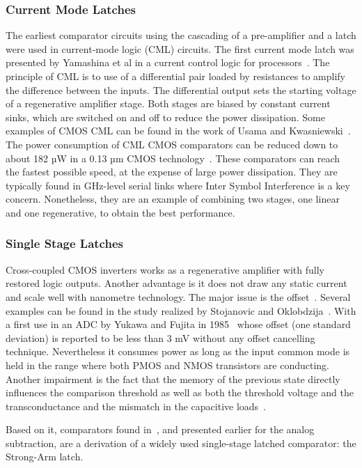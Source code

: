 \subsubsection{Current Mode Latches}
The earliest comparator circuits using the cascading of a pre-amplifier and a latch were used in current-mode logic (CML) circuits. The first current mode latch was presented by Yamashina et al in a current control logic for processors~\cite{Yamashina1994}. The principle of CML is to use of a differential pair loaded by resistances to amplify the difference between the inputs. The differential output sets the starting voltage of a regenerative amplifier stage. Both stages are biased by constant current sinks, which are switched on and off to reduce the power dissipation. Some examples of CMOS CML can be  found in the work of Usama and Kwasniewski~\cite{Usama2004}. The power consumption of CML CMOS comparators can be reduced down to about 182 µW in a 0.13 µm CMOS technology~\cite{Zhang2014cmp}. These comparators can reach the fastest possible speed, at the expense of large power dissipation. They are typically found in GHz-level serial links where Inter Symbol Interference is a key concern. Nonetheless, they are an example of combining two stages, one linear and one regenerative, to obtain the best performance.

\subsubsection{Single Stage Latches}
Cross-coupled CMOS inverters works as a regenerative amplifier with fully restored logic outputs. Another advantage is it does not draw any static current and scale well with nanometre technology. The major issue is the offset~\cite{Hajimiri1998}. Several examples can be found in the study realized by Stojanovic and Oklobdzija~\cite{Nikolic2000}. With a first use in an ADC by Yukawa and Fujita in 1985~\cite{Yukawa1985} whose offset (one standard deviation) is reported to be less than 3 mV without any offset cancelling technique. Nevertheless it consumes power as long as the input common mode is held in the range where both PMOS and NMOS transistors are conducting. Another impairment is the fact that the memory of the previous state directly influences the comparison threshold as well as both the threshold voltage and the transconductance and the mismatch in the capacitive loads~\cite{Nikoozadeh2006}.

Based on it, comparators found in~\cite{Sumanen2000,Sumanen2002}, and presented earlier for the analog subtraction, are a derivation of a widely used single-stage latched comparator: the Strong-Arm latch.


